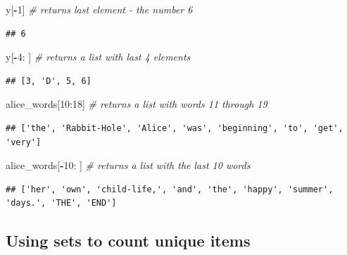 \documentclass[
]{book}
\newenvironment{Shaded}{\begin{snugshade}}{\end{snugshade}}
\newcommand{\CommentTok}[1]{\textcolor[rgb]{0.56,0.35,0.01}{\textit{#1}}}
\newcommand{\DecValTok}[1]{\textcolor[rgb]{0.00,0.00,0.81}{#1}}
\newcommand{\NormalTok}[1]{#1}
\newcommand{\OperatorTok}[1]{\textcolor[rgb]{0.81,0.36,0.00}{\textbf{#1}}}
\begin{document}
\begin{Shaded}
\begin{Highlighting}[]
\NormalTok{y[}\OperatorTok{{-}}\DecValTok{1}\NormalTok{] }\CommentTok{\# returns last element {-} the number 6 }
\end{Highlighting}
\end{Shaded}

\begin{verbatim}
## 6
\end{verbatim}

\begin{Shaded}
\begin{Highlighting}[]
\NormalTok{y[}\OperatorTok{{-}}\DecValTok{4}\NormalTok{: ] }\CommentTok{\# returns a list with last 4 elements}
\end{Highlighting}
\end{Shaded}

\begin{verbatim}
## [3, 'D', 5, 6]
\end{verbatim}

\begin{Shaded}
\begin{Highlighting}[]
\NormalTok{alice\_words[}\DecValTok{10}\NormalTok{:}\DecValTok{18}\NormalTok{] }\CommentTok{\# returns a list with words 11 through 19}
\end{Highlighting}
\end{Shaded}

\begin{verbatim}
## ['the', 'Rabbit-Hole', 'Alice', 'was', 'beginning', 'to', 'get', 'very']
\end{verbatim}

\begin{Shaded}
\begin{Highlighting}[]
\NormalTok{alice\_words[}\OperatorTok{{-}}\DecValTok{10}\NormalTok{: ] }\CommentTok{\# returns a list with the last 10 words}
\end{Highlighting}
\end{Shaded}

\begin{verbatim}
## ['her', 'own', 'child-life,', 'and', 'the', 'happy', 'summer', 'days.', 'THE', 'END']
\end{verbatim}

\hypertarget{using-sets-to-count-unique-items}{%
\subsection{Using sets to count unique items}\label{using-sets-to-count-unique-items}}
\end{document}
